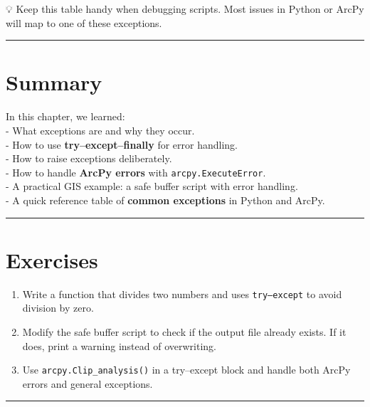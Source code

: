 \documentclass[
  11pt,
  letterpaper,
]{book}
\providecommand{\tightlist}{%
  \setlength{\itemsep}{0pt}\setlength{\parskip}{0pt}}
\begin{document}
💡 Keep this table handy when debugging scripts. Most issues in Python
or ArcPy will map to one of these exceptions.

\begin{center}\rule{0.5\linewidth}{0.5pt}\end{center}

\section{Summary}\label{summary-4}

In this chapter, we learned:\\
- What exceptions are and why they occur.\\
- How to use \textbf{try--except--finally} for error handling.\\
- How to raise exceptions deliberately.\\
- How to handle \textbf{ArcPy errors} with
\texttt{arcpy.ExecuteError}.\\
- A practical GIS example: a safe buffer script with error handling.\\
- A quick reference table of \textbf{common exceptions} in Python and
ArcPy.

\begin{center}\rule{0.5\linewidth}{0.5pt}\end{center}

\section{Exercises}\label{exercises}

\begin{enumerate}
\def\labelenumi{\arabic{enumi}.}
\tightlist
\item
  Write a function that divides two numbers and uses \texttt{try–except}
  to avoid division by zero.\\
\item
  Modify the safe buffer script to check if the output file already
  exists. If it does, print a warning instead of overwriting.\\
\item
  Use \texttt{arcpy.Clip\_analysis()} in a try--except block and handle
  both ArcPy errors and general exceptions.
\end{enumerate}

\begin{center}\rule{0.5\linewidth}{0.5pt}\end{center}


\backmatter
\end{document}
